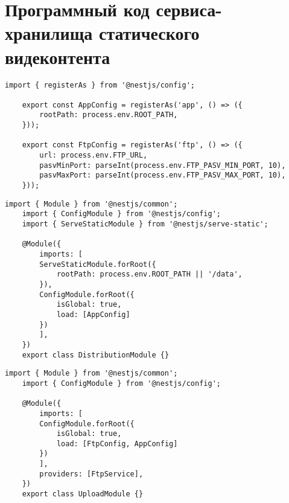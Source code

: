 \chapter{Программный код сервиса-хранилища статического видеконтента}

\begin{lstlisting}[caption={config.ts}]
	import { registerAs } from '@nestjs/config';
	
	export const AppConfig = registerAs('app', () => ({
		rootPath: process.env.ROOT_PATH,
	}));
	
	export const FtpConfig = registerAs('ftp', () => ({
		url: process.env.FTP_URL,
		pasvMinPort: parseInt(process.env.FTP_PASV_MIN_PORT, 10),
		pasvMaxPort: parseInt(process.env.FTP_PASV_MAX_PORT, 10),
	}));
\end{lstlisting}

\begin{lstlisting}[caption={distribution.module.ts}]
	import { Module } from '@nestjs/common';
	import { ConfigModule } from '@nestjs/config';
	import { ServeStaticModule } from '@nestjs/serve-static';
	
	@Module({
		imports: [
		ServeStaticModule.forRoot({
			rootPath: process.env.ROOT_PATH || '/data',
		}),
		ConfigModule.forRoot({
			isGlobal: true,
			load: [AppConfig]
		})
		],
	})
	export class DistributionModule {}
\end{lstlisting}

\begin{lstlisting}[caption={uploader.module.ts}]
	import { Module } from '@nestjs/common';
	import { ConfigModule } from '@nestjs/config';
	
	@Module({
		imports: [
		ConfigModule.forRoot({
			isGlobal: true,
			load: [FtpConfig, AppConfig]
		})
		],
		providers: [FtpService],
	})
	export class UploadModule {}
\end{lstlisting}

